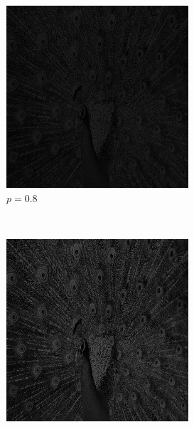 \documentclass{article}
\begin{document}
\begin{enumerate}[label=(\alph*)]
\begin{figure}[!htb]
        \begin{subfigure}[b]{0.3\textwidth}
            \includegraphics[width=\textwidth]{img/PL08.png}
            \caption{$p = 0.8$}
        \end{subfigure}
        ~
        \begin{subfigure}[b]{0.3\textwidth}
            \includegraphics[width=\textwidth]{img/PL10.png}

\end{subfigure}
\end{figure}
\end{enumerate}
\end{document}
